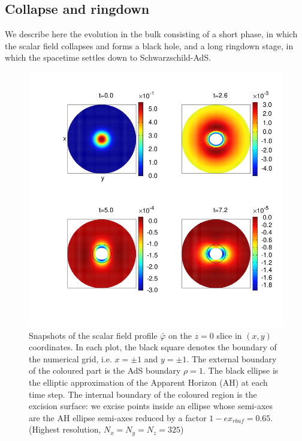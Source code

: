 \documentclass[a4paper,11pt]{article}
\numberwithin{equation}{section}
\begin{document}


\subsection{Collapse and ringdown}\label{sec:rescolring}

We describe here the evolution in the bulk consisting of a short phase, in which the scalar field collapses and forms a black hole, and a long ringdown stage, in which the spacetime settles down to Schwarzschild-AdS.

\begin{figure}[!h]
        \centering
        \includegraphics[width=5.2in,clip=true]{plots/bulkplots/L3/phi1/phi1_L3_snapshots_2by2.png}
\parbox{5.0in}{\caption{Snapshots of the scalar field profile $\bar{\varphi}$ on the $z=0$ slice in $(x,y)$ coordinates. In each plot, the black square denotes the boundary of the numerical grid, i.e. $x=\pm 1$ and $y=\pm 1$. The external boundary of the coloured part is the AdS boundary $\rho=1$. The black ellipse is the elliptic approximation of the Apparent Horizon (AH) at each time step. The internal boundary of the coloured region is the excision surface: we excise points inside an ellipse whose semi-axes are the AH ellipse semi-axes reduced by a factor $1-ex_{rbuf}=0.65$. (Highest resolution, $N_x=N_y=N_z=325$)
        }\label{fig:snapshotsscalarfield}}
\end{figure}
\end{document}

